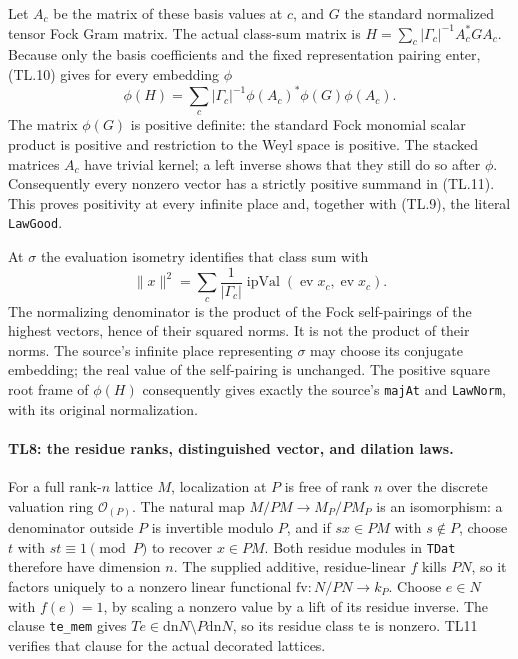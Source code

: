 Let $A_c$ be the matrix of these basis values at $c$, and $G$ the
standard normalized tensor Fock Gram matrix. The actual class-sum
matrix is $H=\sum_c |\Gamma_c|^{-1}A_c^*GA_c$. Because only the
basis coefficients and the fixed representation pairing enter,
(TL.10) gives for every embedding $\phi$
\[
 \phi(H)=\sum_c |\Gamma_c|^{-1}
               \phi(A_c)^*\phi(G)\phi(A_c).       \tag{TL.11}
\]
The matrix $\phi(G)$ is positive definite: the standard Fock
monomial scalar product is positive and restriction to the Weyl
space is positive. The stacked matrices $A_c$ have trivial kernel;
a left inverse shows that they still do so after $\phi$.
Consequently every nonzero vector has a strictly positive summand
in (TL.11). This proves positivity at every infinite place and,
together with (TL.9), the literal \texttt{LawGood}.

At $\sigma$ the evaluation isometry identifies that class sum with
\[
 \|x\|^2=\sum_c\frac{1}{|\Gamma_c|}
               \operatorname{ipVal}(\operatorname{ev}x_c,
                                     \operatorname{ev}x_c).
 \tag{TL.12}
\]
The normalizing denominator is the product of the Fock
self-pairings of the highest vectors, hence of their squared
norms. It is not the product of their norms. The source's infinite
place representing $\sigma$ may choose its conjugate embedding;
the real value of the self-pairing is unchanged. The positive square
root frame of $\phi(H)$ consequently gives exactly the source's
\texttt{majAt} and \texttt{LawNorm}, with its original normalization.

\paragraph{TL8: the residue ranks, distinguished vector, and dilation
laws.}
For a full rank-$n$ lattice $M$, localization at $P$ is free of rank
$n$ over the discrete valuation ring $\mathcal O_{(P)}$. The natural
map $M/PM\to M_P/PM_P$ is an isomorphism: a denominator outside
$P$ is invertible modulo $P$, and if $sx\in PM$ with $s\notin P$,
choose $t$ with $st\equiv1\pmod P$ to recover $x\in PM$.
Both residue modules in \texttt{TDat} therefore have dimension $n$.
The supplied additive, residue-linear $f$ kills $PN$, so it factors
uniquely to a nonzero linear functional $\mathrm{fv}:N/PN\to k_P$.
Choose $e\in N$ with $f(e)=1$, by scaling a nonzero value by a lift
of its residue inverse. The clause \texttt{te\_mem} gives
$Te\in\mathrm{dn}N\setminus P\mathrm{dn}N$, so its residue class
$\mathrm{te}$ is nonzero. TL11 verifies that clause for the actual
decorated lattices.

